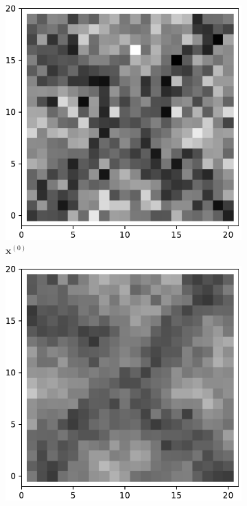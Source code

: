    \begin{figure}[h]
        \centering
        \begin{subfigure}[b]{0.24\textwidth}
            \centering
            \includegraphics[width=\textwidth]{./img/ximage.pdf}
            \caption[]%
            {{\small $\mathbf{x}^{(0)}$}}    
            \label{fig:ximage1}
        \end{subfigure}
        \begin{subfigure}[b]{0.24\textwidth}  
            \centering 
            \includegraphics[width=\textwidth]{./img/5d2-0.pdf}

\end{subfigure}
\end{figure}

